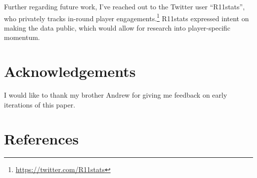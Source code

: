 \documentclass{article}
\begin{document}
Further regarding future work, I've reached out to the Twitter user
``R11stats'', who privately tracks in-round player
engagements.\footnote{\url{https://twitter.com/R11stats}} R11stats
expressed intent on making the data public, which would allow for
research into player-specific momentum.

\hypertarget{acknowledgements}{%
\section*{Acknowledgements}\label{acknowledgements}}

I would like to thank my brother Andrew for giving me feedback on early
iterations of this paper.

\hypertarget{references}{%
\section*{References}\label{references}}
\end{document}

